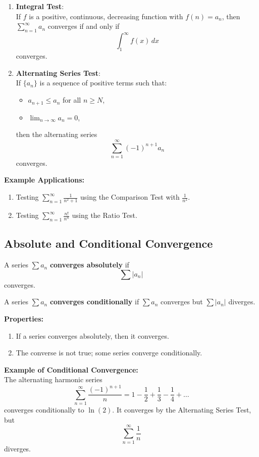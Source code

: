 \documentclass{article}
\begin{document}
\begin{enumerate}[label=\textbf{\arabic*.}]
    \item \textbf{Integral Test}: \\
    If $f$ is a positive, continuous, decreasing function with $f(n) = a_n$, then $\sum_{n=1}^{\infty} a_n$ converges if and only if 
    \[
    \int_{1}^{\infty} f(x) \, dx
    \]
    converges.
    
    \item \textbf{Alternating Series Test}: \\
    If $\{a_n\}$ is a sequence of positive terms such that:
    \begin{itemize}
        \item $a_{n+1} \leq a_n$ for all $n \geq N$,
        \item $\lim_{n \to \infty} a_n = 0$,
    \end{itemize}
    then the alternating series 
    \[
    \sum_{n=1}^{\infty} (-1)^{n+1} a_n
    \]
    converges.
\end{enumerate}

\textbf{Example Applications:}
\begin{enumerate}[label=\textbf{\arabic*.}]
    \item Testing $\sum_{n=1}^{\infty} \frac{1}{n^2 + 1}$ using the Comparison Test with $\frac{1}{n^2}$.
    \item Testing $\sum_{n=1}^{\infty} \frac{n!}{n^n}$ using the Ratio Test.
\end{enumerate}

\subsection{Absolute and Conditional Convergence} \label{absolute-convergence}

A series $\sum a_n$ \textbf{converges absolutely} if 
\[
\sum |a_n|
\]
converges.

A series $\sum a_n$ \textbf{converges conditionally} if $\sum a_n$ converges but $\sum |a_n|$ diverges.

\textbf{Properties:}
\begin{enumerate}[label=(\arabic*)]
    \item If a series converges absolutely, then it converges.
    \item The converse is not true; some series converge conditionally.
\end{enumerate}

\textbf{Example of Conditional Convergence:} \\
The alternating harmonic series 
\[
\sum_{n=1}^{\infty} \frac{(-1)^{n+1}}{n} = 1 - \frac{1}{2} + \frac{1}{3} - \frac{1}{4} + \ldots
\]
converges conditionally to $\ln(2)$. It converges by the Alternating Series Test, but 
\[
\sum_{n=1}^{\infty} \frac{1}{n}
\]
diverges.
\end{document}
